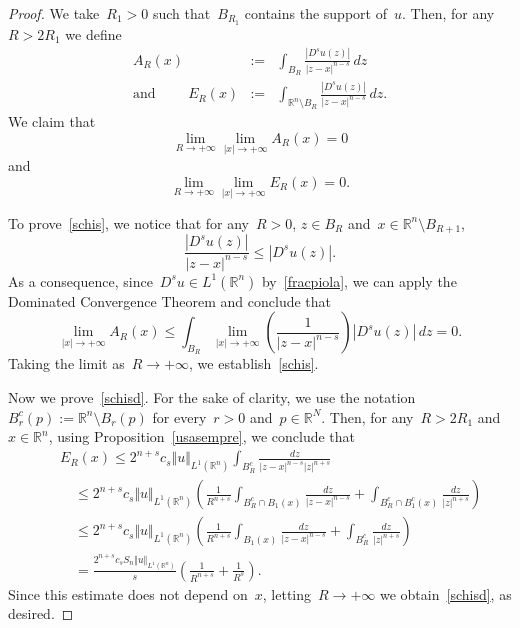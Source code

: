 \documentclass[11pt,hyp,]{nyjm}
\numberwithin{equation}{section}
\newcommand{\R}{\mathbb{R}}
\theoremstyle{remark}
\renewcommand{\leq}{\leqslant}
\renewcommand{\le}{\leqslant}
\begin{document}
\begin{proof}
We take~$R_1>0$ such that~$B_{R_1}$ contains the support of~$u$. Then, for any~$R>2R_1$ we define
\begin{eqnarray*}A_R(x)&:=& \int_{B_{R}} \frac{|D^{s}u(z)|}{|z-x|^{n-s}} \, dz \\
{\mbox{and }}\qquad
E_R(x)&:=& \int_{\R^n \setminus B_{R}} \frac{|D^{s}u(z)|}{|z-x|^{n-s}} \, dz. \end{eqnarray*}
We claim that
\begin{equation}\label{schis}
\lim_{R \to +\infty} \lim_{|x| \to +\infty} A_R(x) = 0 
\end{equation}
and
\begin{equation}\label{schisd}
\lim_{R \to  +\infty } \lim_{|x| \to +\infty} E_R(x) = 0. 
\end{equation}

To prove~\eqref{schis}, we notice that for any~$R>0$, $z\in B_R$ and~$x\in\R^n\setminus B_{ R +1}$,
\[ \frac{| D^{s}u(z)|}{|z-x|^{n-s}}  \leq |D^{s}u(z)|. \]
As a consequence, since~$D^su \in L^1(\R^n)$ by~\eqref{fracpiola}, we can apply the Dominated Convergence Theorem and conclude that
				\[\lim_{|x| \to +\infty} A_R(x) \leq \int_{B_{R}}  \lim_{|x| \to +\infty} \left(\frac{1}{|z-x|^{n-s}} \right) |D^{s}u(z)| \, dz = 0. \]
				Taking the limit as~$R \to +\infty$, we establish~\eqref{schis}.
				
Now we prove~\eqref{schisd}. For the sake of clarity, we use the
notation~$B^c_r(p):=\R^n \setminus B_r(p)$ for every~$r>0$ and~$p\in\R^N$.
Then, for any~$R>2R_1$ and~$x \in \R^n$, using Proposition~\ref{usasempre},
we conclude that
\begin{eqnarray*}&&
E_R(x) \le 2^{n+s} c_s  \Vert u \Vert_{L^1(\R^n)} \int_{ B_{R}^c} \frac{dz}{|z-x|^{n-s}|z|^{n+s}} 
\\&&\quad\le 2^{n+s} c_s  \Vert u \Vert_{L^1(\R^n)} 
 \left(\frac{1}{ R^{n+s}}
 \int_{B^c_{R} \cap B_1(x)} \frac{dz}{|z-x|^{n-s}} + \int_{B^c_{R}\cap
 B_1^c(x)} \frac{dz}{|z|^{n+s}}\right)\\ 
&&\quad\leq 2^{n+s} c_s  \Vert u \Vert_{L^1(\R^n)} \left( \frac{1}{ R^{n+s}} \int_{B_1(x)} \frac{dz}{|z-x|^{n-s}} + \int_{B^c_{R}} \frac{dz}{|z|^{n+s}} \right) \\ 
&&\quad= \frac{2^{n+s} c_s S_n \Vert u \Vert_{L^1(\R^n)}}{s} \left( \frac{1}{R^{n+s}}+ \frac{1}{R^{s}} \right).
\end{eqnarray*}
Since this estimate does not depend on~$x$, letting~$R \to +\infty$ we obtain~\eqref{schisd}, as desired.


\end{proof}
\end{document}
